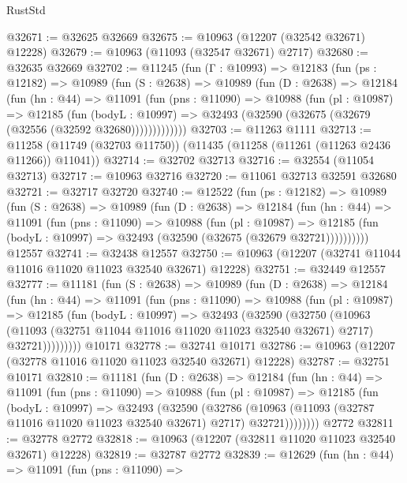\begin{lexlean}{RustStd}
\begin{coremodule}
@32671 := @32625 @32669
@32675 := @10963 (@12207 (@32542 @32671) @12228)
@32679 := @10963 (@11093 (@32547 @32671) @2717)
@32680 := @32635 @32669
@32702 := @11245
    (fun (Γ : @10993) =>
    @12183
      (fun (ps : @12182) =>
      @10989
        (fun (S : @2638) =>
        @10989
          (fun (D : @2638) =>
          @12184
            (fun (hn : @44) =>
            @11091
              (fun (pns : @11090) =>
              @10988
                (fun (pl : @10987) =>
                @12185
                  (fun (bodyL : @10997) =>
                  @32493 (@32590 (@32675 (@32679 (@32556 (@32592 @32680)))))))))))))
@32703 := @11263 @1111
@32713 := @11258 (@11749 (@32703 @11750)) (@11435 (@11258 (@11261 (@11263 @2436 @11266)) @11041))
@32714 := @32702 @32713
@32716 := @32554 (@11054 @32713)
@32717 := @10963 @32716
@32720 := @11061 @32713 @32591 @32680
@32721 := @32717 @32720
@32740 := @12522
    (fun (ps : @12182) =>
    @10989
      (fun (S : @2638) =>
      @10989
        (fun (D : @2638) =>
        @12184
          (fun (hn : @44) =>
          @11091
            (fun (pns : @11090) =>
            @10988
              (fun (pl : @10987) =>
              @12185 (fun (bodyL : @10997) => @32493 (@32590 (@32675 (@32679 @32721))))))))))
    @12557
@32741 := @32438 @12557
@32750 := @10963 (@12207 (@32741 @11044 @11016 @11020 @11023 @32540 @32671) @12228)
@32751 := @32449 @12557
@32777 := @11181
    (fun (S : @2638) =>
    @10989
      (fun (D : @2638) =>
      @12184
        (fun (hn : @44) =>
        @11091
          (fun (pns : @11090) =>
          @10988
            (fun (pl : @10987) =>
            @12185
              (fun (bodyL : @10997) =>
              @32493
                (@32590
                  (@32750
                    (@10963
                      (@11093 (@32751 @11044 @11016 @11020 @11023 @32540 @32671) @2717)
                      @32721)))))))))
    @10171
@32778 := @32741 @10171
@32786 := @10963 (@12207 (@32778 @11016 @11020 @11023 @32540 @32671) @12228)
@32787 := @32751 @10171
@32810 := @11181
    (fun (D : @2638) =>
    @12184
      (fun (hn : @44) =>
      @11091
        (fun (pns : @11090) =>
        @10988
          (fun (pl : @10987) =>
          @12185
            (fun (bodyL : @10997) =>
            @32493
              (@32590
                (@32786
                  (@10963 (@11093 (@32787 @11016 @11020 @11023 @32540 @32671) @2717) @32721))))))))
    @2772
@32811 := @32778 @2772
@32818 := @10963 (@12207 (@32811 @11020 @11023 @32540 @32671) @12228)
@32819 := @32787 @2772
@32839 := @12629
    (fun (hn : @44) =>
    @11091
      (fun (pns : @11090) =>

\end{coremodule}
\end{lexlean}
